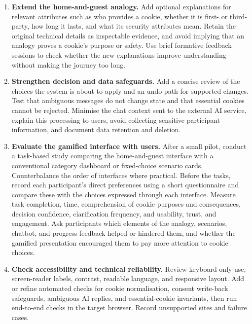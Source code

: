 \documentclass[11pt,a4paper]{report}
\begin{document}
\begin{enumerate}
  \item \textbf{Extend the home-and-guest analogy.} Add optional explanations for relevant attributes such as who provides a cookie, whether it is first- or third-party, how long it lasts, and what its security attributes mean. Retain the original technical details as inspectable evidence, and avoid implying that an analogy proves a cookie's purpose or safety. Use brief formative feedback sessions to check whether the new explanations improve understanding without making the journey too long.

  \item \textbf{Strengthen decision and data safeguards.} Add a concise review of the choices the system is about to apply and an undo path for supported changes. Test that ambiguous messages do not change state and that essential cookies cannot be rejected. Minimise the chat context sent to the external AI service, explain this processing to users, avoid collecting sensitive participant information, and document data retention and deletion.

  \item \textbf{Evaluate the gamified interface with users.} After a small pilot, conduct a task-based study comparing the home-and-guest interface with a conventional category dashboard or fixed-choice scenario cards. Counterbalance the order of interfaces where practical. Before the tasks, record each participant's direct preferences using a short questionnaire and compare these with the choices expressed through each interface. Measure task completion, time, comprehension of cookie purposes and consequences, decision confidence, clarification frequency, and usability, trust, and engagement. Ask participants which elements of the analogy, scenarios, chatbot, and progress feedback helped or hindered them, and whether the gamified presentation encouraged them to pay more attention to cookie choices. 

  \item \textbf{Check accessibility and technical reliability.} Review keyboard-only use, screen-reader labels, contrast, readable language, and responsive layout. Add or refine automated checks for cookie normalisation, consent write-back safeguards, ambiguous AI replies, and essential-cookie invariants, then run end-to-end checks in the target browser. Record unsupported sites and failure cases.
\end{enumerate}
\end{document}
